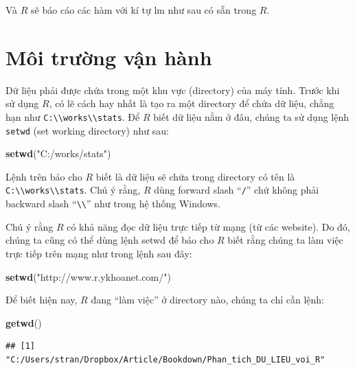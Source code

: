 \documentclass[
]{book}
\newenvironment{Shaded}{\begin{snugshade}}{\end{snugshade}}
\newcommand{\KeywordTok}[1]{\textcolor[rgb]{0.13,0.29,0.53}{\textbf{#1}}}
\newcommand{\NormalTok}[1]{#1}
\newcommand{\StringTok}[1]{\textcolor[rgb]{0.31,0.60,0.02}{#1}}
\begin{document}
Và \(R\) sẽ báo cáo các hàm với kí tự lm như sau có sẵn trong \(R\).

\hypertarget{muxf4i-trux1b0ux1eddng-vux1eadn-huxe0nh}{%
\section{Môi trường vận hành}\label{muxf4i-trux1b0ux1eddng-vux1eadn-huxe0nh}}

Dữ liệu phải được chứa trong một khu vực (directory) của máy tính. Trước khi sử dụng \(R\), có lẽ cách hay nhất là tạo ra một directory để chứa dữ liệu, chẳng hạn như \texttt{C:\textbackslash{}\textbackslash{}works\textbackslash{}\textbackslash{}stats}. Để \(R\) biết dữ liệu nằm ở đâu, chúng ta sử dụng lệnh \texttt{setwd} (set working directory) như sau:

\begin{Shaded}
\begin{Highlighting}[]
\KeywordTok{setwd}\NormalTok{(}\StringTok{"C:/works/stats"}\NormalTok{) }
\end{Highlighting}
\end{Shaded}

Lệnh trên báo cho \(R\) biết là dữ liệu sẽ chứa trong directory có tên là \texttt{C:\textbackslash{}\textbackslash{}works\textbackslash{}\textbackslash{}stats}. Chú ý rằng, \(R\) dùng forward slash ``\texttt{/}'' chứ không phải backward slash ``\texttt{\textbackslash{}\textbackslash{}}'' như trong hệ thống Windows.

Chú ý rằng \(R\) có khả năng đọc dữ liệu trực tiếp từ mạng (từ các website). Do đó, chúng ta cũng có thể dùng lệnh setwd để báo cho \(R\) biết rằng chúng ta làm việc trực tiếp trên mạng như trong lệnh sau đây:

\begin{Shaded}
\begin{Highlighting}[]
\KeywordTok{setwd}\NormalTok{(}\StringTok{"http://www.r.ykhoanet.com/"}\NormalTok{)}
\end{Highlighting}
\end{Shaded}

Để biết hiện nay, \(R\) đang ``làm việc'' ở directory nào, chúng ta chỉ cần lệnh:

\begin{Shaded}
\begin{Highlighting}[]
\KeywordTok{getwd}\NormalTok{()}
\end{Highlighting}
\end{Shaded}

\begin{verbatim}
## [1] "C:/Users/stran/Dropbox/Article/Bookdown/Phan_tich_DU_LIEU_voi_R"
\end{verbatim}
\end{document}
